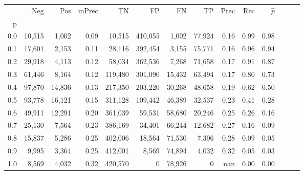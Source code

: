 \begin{tabular}{rrrrrrrrrrrrrr}
\toprule
{} &     Neg &     Pos & mPrec &       TN &       FP &      FN &      TP &  Prec &   Rec & $\hat{p}$ \\
p   &         &         &       &          &          &         &         &       &       &           \\
\midrule
0.0 &  10,515 &   1,002 &  0.09 &   10,515 &  410,055 &   1,002 &  77,924 &  0.16 &  0.99 &      0.98 \\
0.1 &  17,601 &   2,153 &  0.11 &   28,116 &  392,454 &   3,155 &  75,771 &  0.16 &  0.96 &      0.94 \\
0.2 &  29,918 &   4,113 &  0.12 &   58,034 &  362,536 &   7,268 &  71,658 &  0.17 &  0.91 &      0.87 \\
0.3 &  61,446 &   8,164 &  0.12 &  119,480 &  301,090 &  15,432 &  63,494 &  0.17 &  0.80 &      0.73 \\
0.4 &  97,870 &  14,836 &  0.13 &  217,350 &  203,220 &  30,268 &  48,658 &  0.19 &  0.62 &      0.50 \\
0.5 &  93,778 &  16,121 &  0.15 &  311,128 &  109,442 &  46,389 &  32,537 &  0.23 &  0.41 &      0.28 \\
0.6 &  49,911 &  12,291 &  0.20 &  361,039 &   59,531 &  58,680 &  20,246 &  0.25 &  0.26 &      0.16 \\
0.7 &  25,130 &   7,564 &  0.23 &  386,169 &   34,401 &  66,244 &  12,682 &  0.27 &  0.16 &      0.09 \\
0.8 &  15,837 &   5,286 &  0.25 &  402,006 &   18,564 &  71,530 &   7,396 &  0.28 &  0.09 &      0.05 \\
0.9 &   9,995 &   3,364 &  0.25 &  412,001 &    8,569 &  74,894 &   4,032 &  0.32 &  0.05 &      0.03 \\
1.0 &   8,569 &   4,032 &  0.32 &  420,570 &        0 &  78,926 &       0 &   nan &  0.00 &      0.00 \\
\bottomrule
\end{tabular}
